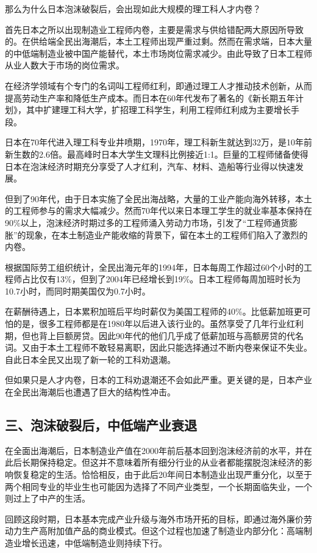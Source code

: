 那么为什么日本泡沫破裂后，会出现如此大规模的理工科人才内卷？

首先日本之所以出现制造业工程师内卷，主要是需求与供给错配两大原因所导致的。在供给端全民出海潮后，本土工程师出现严重过剩。然而在需求端，日本大量的中低端制造业被中国产能替代，本土市场岗位需求减少。由此导致了日本工程师从业人数大于市场的岗位需求。

在经济学领域有个专门的名词叫工程师红利，即通过理工人才推动技术创新，从而提高劳动生产率和降低生产成本。而日本在60年代发布了著名的《新长期五年计划》，其中扩建理工科大学，扩招理工科学生，利用工程师红利成为主要增长手段。

日本在70年代进入理工科专业井喷期，1970年，理工科新生就达到32万，是10年前新生数的2.6倍。最高峰时日本大学生文理科比例接近1:1。巨量的工程师储备使得日本在泡沫经济时期充分享受了人才红利，汽车、材料、造船等行业得以快速发展。

但到了90年代，由于日本实施了全民出海战略，大量的工业产能向海外转移，本土的工程师参与的需求大幅减少。然而70年代以来日本理工学生的就业率基本保持在90\%以上，泡沫经济时期过多的工程师涌入劳动力市场，引发了“工程师通货膨胀”的现象，在本土制造业产能收缩的背景下，留在本土的工程师们陷入了激烈的内卷。

根据国际劳工组织统计，全民出海元年的1994年，日本每周工作超过60个小时的工程师占比仅有13\%，但到了2004年已经增长到19\%。日本工程师每周加班时长为10.7小时，而同时期美国仅为0.7小时。

在薪酬待遇上，日本累积加班后平均时薪仅为美国工程师的40\%。比低薪加班更可怕的是，很多工程师都是在1980年以后进入该行业的。虽然享受了几年行业红利期，但也背上巨额房贷。因此90年代的他们几乎成了低薪加班与高额房贷的代名词。又由于本土工程师不敢轻易离职，因此只能选择通过不断内卷来保证不失业。自此日本全民又出现了新一轮的工科劝退潮。

但如果只是人才内卷，日本的工科劝退潮还不会如此严重。更关键的是，日本产业在全民出海潮后也遭遇了巨大的结构性冲击。

\subsection{三、泡沫破裂后，中低端产业衰退}

在全面出海潮后，日本制造业产值在2000年前后基本回到泡沫经济前的水平，并在此后长期保持稳定。但这并不意味着所有细分行业的从业者都能摆脱泡沫经济的影响恢复稳定的生活。恰恰相反，由于此后20年间日本制造业出现严重分化，以至于两个相同专业的毕业生也可能因为选择了不同产业类型，一个长期面临失业，一个则过上了中产的生活。

回顾这段时期，日本基本完成产业升级与海外市场开拓的目标，即通过海外廉价劳动力生产高附加值产品的商业模式。但这个过程也加速了制造业内部分化：高端制造业增长迅速，中低端制造业则持续下行。

